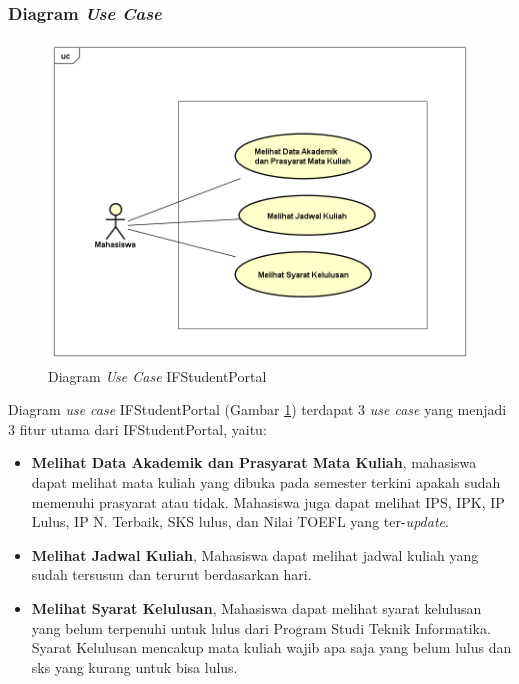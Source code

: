 \subsubsection{Diagram \textit{Use Case}}
	\begin{figure}[H]
			\centering
			\includegraphics[scale=0.5]{Gambar/usecasediagram_ifstudentportal}
			\caption{Diagram \textit{Use Case} IFStudentPortal} 
			\label{fig:3_usecase_diagram}
		\end{figure}
Diagram \textit{use case} IFStudentPortal (Gambar \ref{fig:3_usecase_diagram}) terdapat 3 \textit{use case} yang menjadi 3 fitur utama dari IFStudentPortal, yaitu:
\begin{itemize}
	\item \textbf{Melihat Data Akademik dan Prasyarat Mata Kuliah}, mahasiswa dapat melihat mata kuliah yang dibuka pada semester terkini apakah sudah memenuhi prasyarat atau tidak. Mahasiswa juga dapat melihat IPS, IPK, IP Lulus, IP N. Terbaik, SKS lulus, dan Nilai TOEFL yang ter-\textit{update}.
	\item \textbf{Melihat Jadwal Kuliah}, Mahasiswa dapat melihat jadwal kuliah yang sudah tersusun dan terurut berdasarkan hari.
	\item \textbf{Melihat Syarat Kelulusan}, Mahasiswa dapat melihat syarat kelulusan yang belum terpenuhi untuk lulus dari Program Studi Teknik Informatika. Syarat Kelulusan mencakup mata kuliah wajib apa saja yang belum lulus dan sks yang kurang untuk bisa lulus.
\end{itemize}
